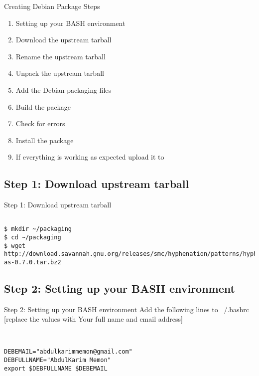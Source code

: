 \documentclass[red,10pt,a4paper]{beamer}
\begin{document}
\begin{frame}{Creating Debian Package Steps}
\begin{enumerate}
	\item Setting up your BASH environment
	\item Download the upstream tarball
	\item Rename the upstream tarball
	\item Unpack the upstream tarball
	\item Add the Debian packaging files
	\item Build the package
	\item Check for errors
	\item Install the package
	\item If everything is working as expected upload it to 
\end{enumerate}

\end{frame}

\subsection{Step 1: Download upstream tarball}

\begin{frame}[fragile]{Step 1: Download upstream tarball}
\lstset{breaklines=true}
\lstset{makemacrouse=true}
\begin{lstlisting}

$ mkdir ~/packaging
$ cd ~/packaging
$ wget http://download.savannah.gnu.org/releases/smc/hyphenation/patterns/hyphen-as-0.7.0.tar.bz2
    \end{lstlisting} 
\end{frame}



\subsection{Step 2: Setting up your BASH environment}

\begin{frame}[fragile]{Step 2: Setting up your BASH environment}
\lstset{breaklines=true}
\lstset{makemacrouse=true}
Add the following lines to ~/.bashrc
[replace the values with Your full name and email address]
\begin{lstlisting}


DEBEMAIL="abdulkarimmemon@gmail.com"
DEBFULLNAME="AbdulKarim Memon"
export $DEBFULLNAME $DEBEMAIL
    \end{lstlisting} 
\end{frame}
\end{document}
